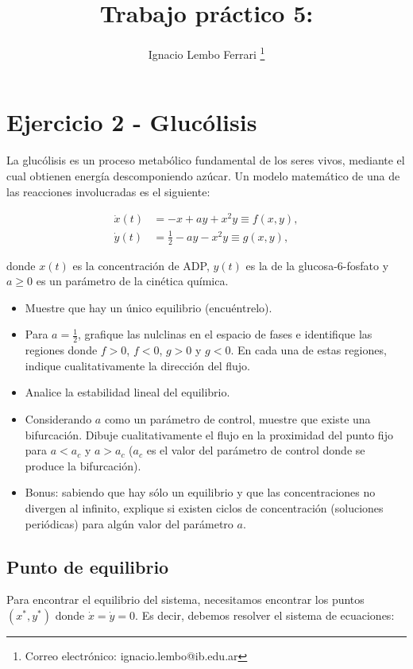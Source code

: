 \documentclass[letterpaper,12pt]{article}
\title{Trabajo práctico 5: } %
\author[1]{Ignacio Lembo Ferrari \thanks{Correo electrónico: ignacio.lembo@ib.edu.ar}}
\affil[1]{Instituto Balseiro}
\date{\vspace{-4ex}}
\theoremstyle{plain}
\begin{document}
\maketitle

\section{Ejercicio 2 - Glucólisis}

La glucólisis es un proceso metabólico fundamental de los seres vivos, mediante el cual obtienen energía descomponiendo azúcar. Un modelo matemático de una de las reacciones involucradas es el siguiente:

\begin{align}
\dot{x}(t) &= -x + ay + x^2y \equiv f(x, y), \\
\dot{y}(t) &= \frac{1}{2} - ay - x^2y \equiv g(x, y),
\end{align}

donde $x(t)$ es la concentración de ADP, $y(t)$ es la de la glucosa-6-fosfato y $a \geq 0$ es un parámetro de la cinética química.
\begin{itemize}
    \item Muestre que hay un único equilibrio (encuéntrelo).
    \item Para $a = \frac{1}{2}$, grafique las nulclinas en el espacio de fases e identifique las regiones donde $f > 0$, $f < 0$, $g > 0$ y $g < 0$. En cada una de estas regiones, indique cualitativamente la dirección del flujo.
    \item Analice la estabilidad lineal del equilibrio.
    \item Considerando $a$ como un parámetro de control, muestre que existe una bifurcación. Dibuje cualitativamente el flujo en la proximidad del punto fijo para $a < a_c$ y $a > a_c$ ($a_c$ es el valor del parámetro de control donde se produce la bifurcación).
    \item Bonus: sabiendo que hay sólo un equilibrio y que las concentraciones no divergen al infinito, explique si existen ciclos de concentración (soluciones periódicas) para algún valor del parámetro $a$.
\end{itemize}


\subsection{Punto de equilibrio}

Para encontrar el equilibrio del sistema, necesitamos encontrar los puntos $(x^*, y^*)$ donde $\dot{x} = \dot{y} = 0$. Es decir, debemos resolver el sistema de ecuaciones:
\end{document}
